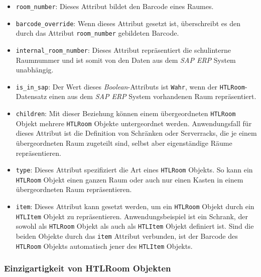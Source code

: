\begin{itemize}
\tightlist
\item
  \texttt{room\_number}: Dieses Attribut bildet den Barcode eines
  Raumes.
\item
  \texttt{barcode\_override}: Wenn dieses Attribut gesetzt ist,
  überschreibt es den durch das Attribut \texttt{room\_number}
  gebildeten Barcode.
\item
  \texttt{internal\_room\_number}: Dieses Attribut repräsentiert die
  schulinterne Raumnummer und ist somit von den Daten aus dem
  \emph{SAP ERP}
  System unabhängig.
\item
  \texttt{is\_in\_sap}: Der Wert dieses
  \emph{Boolean}-Attributs
  ist \texttt{Wahr}, wenn der \texttt{HTLRoom}-Datensatz einen aus dem
  \emph{SAP ERP}
  System vorhandenen Raum repräsentiert.
\item
  \texttt{children}: Mit dieser Beziehung können einem übergeordneten
  \texttt{HTLRoom} Objekt mehrere \texttt{HTLRoom} Objekte untergeordnet
  werden. Anwendungsfall für dieses Attribut ist die Definition von
  Schränken oder Serverracks, die je einem übergeordneten Raum zugeteilt
  sind, selbst aber eigenständige Räume repräsentieren.
\item
  \texttt{type}: Dieses Attribut spezifiziert die Art eines
  \texttt{HTLRoom} Objekts. So kann ein \texttt{HTLRoom} Objekt einen
  ganzen Raum oder auch nur einen Kasten in einem übergeordneten Raum
  repräsentieren.
\item
  \texttt{item}: Dieses Attribut kann gesetzt werden, um ein
  \texttt{HTLRoom} Objekt durch ein \texttt{HTLItem} Objekt zu
  repräsentieren. Anwendungsbeispiel ist ein Schrank, der sowohl als
  \texttt{HTLRoom} Objekt als auch als \texttt{HTLItem} Objekt definiert
  ist. Sind die beiden Objekte durch das \texttt{item} Attribut
  verbunden, ist der Barcode des \texttt{HTLRoom} Objekts automatisch
  jener des \texttt{HTLItem} Objekts.
\end{itemize}

\hypertarget{einzigartigkeit-von-htlroom-objekten}{%
\subsubsection{Einzigartigkeit von HTLRoom
Objekten}\label{einzigartigkeit-von-htlroom-objekten}}

